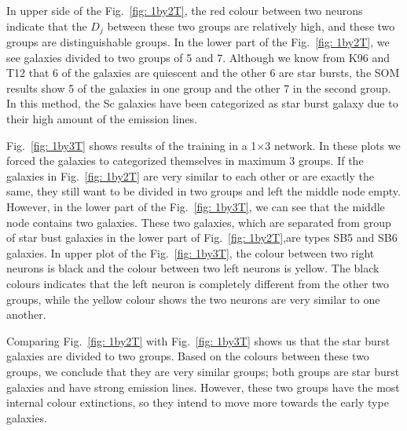        
            In upper side of the Fig.~\ref{fig: 1by2T}, the red colour between two neurons indicate that the $D_j$ between these two groups are relatively high, and these two groups are distinguishable groups.
            In the lower part of the Fig.~\ref{fig: 1by2T}, we see galaxies divided to two groups of 5 and 7.
            Although we know from K96 and T12 that 6 of the galaxies are quiescent and the other 6 are star bursts, the SOM results show 5 of the galaxies in one group and the other 7 in the second group.
            In this method, the Sc galaxies have been categorized as star burst galaxy due to their high amount of the emission lines.
        

            Fig.~\ref{fig: 1by3T} shows results of the training in a 1$\times$3 network.
            In these plots we forced the galaxies to categorized themselves in maximum 3 groups. 
            If the galaxies in Fig.~\ref{fig: 1by2T} are very similar to each other or are exactly the same, they still want to be divided in two groups and left the middle node empty. 
            However, in the lower part of the Fig.~\ref{fig: 1by3T}, we can see that the middle node contains two galaxies.
            These two galaxies, which are separated from group of star bust galaxies in the lower part of Fig.~\ref{fig: 1by2T},are types SB5 and SB6 galaxies.
            In upper plot of the Fig.~\ref{fig: 1by3T}, the colour between two right neurons is black and the colour between two left neurons is yellow. 
            The black colours indicates that the left neuron is completely different from the other two groups, while the yellow colour shows the two neurons are very similar to one another. 
            
            Comparing Fig.~\ref{fig: 1by2T} with Fig.~\ref{fig: 1by3T} shows us that the star burst galaxies are divided to two groups. 
            Based on the colours between these two groups, we conclude that they are very similar groups; both groups are star burst galaxies and have strong emission lines.
            However, these two groups have the most internal colour extinctions, so they intend to move more towards the early type galaxies.
                
